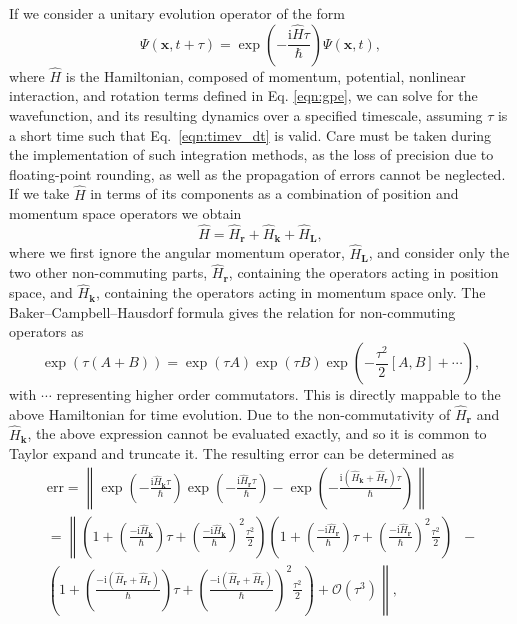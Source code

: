 If we consider a unitary evolution operator of the form
\begin{equation}\label{eqn:1}
\Psi(\mathbf{x},t+\tau) = \exp\left( -\frac{\text{i}\hat{H}\tau}{\hbar}\right)\Psi(\mathbf{x},t),
\end{equation}
where $\hat{H}$ is the Hamiltonian, composed of momentum, potential, nonlinear interaction, and rotation terms defined in Eq. \eqref{eqn:gpe}, we can solve for the wavefunction, and its resulting dynamics over a specified timescale, assuming $\tau$ is a short time such that Eq.~\eqref{eqn:timev_dt} is valid. Care must be taken during the implementation of such integration methods, as the loss of precision due to floating-point rounding, as well as the propagation of errors cannot be neglected. If we take $\hat{H}$ in terms of its components as a combination of position and momentum space operators we obtain
\begin{equation}\label{eqn:2}
\hat{H} = \hat{H}_{\textbf{r}} + \hat{H}_{\textbf{k}} + \hat{H}_{\textbf{L}},
\end{equation}
where we first ignore the angular momentum operator, $\hat{H}_{\textbf{L}}$, and consider only the two other non-commuting parts, $\hat{H}_{\textbf{r}}$, containing the operators acting in position space, and $\hat{H}_{\textbf{k}}$, containing the operators acting in momentum space only. The Baker--Campbell--Hausdorf formula \cite{NUM:Weyrauch_cpc_2009} gives the relation for non-commuting operators as
\begin{equation}
    \exp\left( \tau(A+B) \right) = \exp\left(\tau A\right)\exp\left(\tau B\right)\exp\left(-\frac{\tau^2}{2}[A,B] + \cdots\right),
\end{equation}
with $\cdots$ representing higher order commutators. This is directly mappable to the above Hamiltonian for time evolution. Due to the non-commutativity of $\hat{H}_{\textbf{r}}$ and $\hat{H}_{\textbf{k}}$, the above expression cannot be evaluated exactly, and so it is common to Taylor expand and truncate it. The resulting error can be determined as
\begin{subequations}\label{eqn:error_calc}
\begin{align}
    \text{err} = \left\| \exp\left(-\frac{\textrm{i}\hat{H}_{\textbf{k}}\tau}{\hbar}\right)\exp\left(-\frac{\textrm{i}\hat{H}_{\textbf{r}}\tau}{\hbar}\right) - \exp\left(-\frac{\textrm{i}(\hat{H}_{\textbf{k}} + \hat{H}_{\textbf{r}})\tau}{\hbar}\right) \right\| \\
    = \left\|  \left(1 + \left(\frac{-\textrm{i}\hat{H}_{\textbf{k}}}{\hbar}\right)\tau + \left(\frac{-\textrm{i}\hat{H}_{\textbf{k}}}{\hbar}\right)^2\frac{\tau^2}{2}  \right)\left(1 + \left(\frac{-\textrm{i}\hat{H}_{\textbf{r}}}{\hbar}\right)\tau + \left(\frac{-\textrm{i}\hat{H}_{\textbf{r}}}{\hbar}\right)^2\frac{\tau^2}{2}  \right) \right. &- \nonumber \\ \left. \left(1 + \left(\frac{-\textrm{i}(\hat{H}_{\textbf{r}} + \hat{H}_{\textbf{r}})}{\hbar}\right)\tau + \left(\frac{-\textrm{i}(\hat{H}_{\textbf{r}} + \hat{H}_{\textbf{r}})}{\hbar}\right)^2\frac{\tau^2}{2}  \right)  + \mathcal{O}(\tau^3) \right\|,
\end{align}
\end{subequations}
